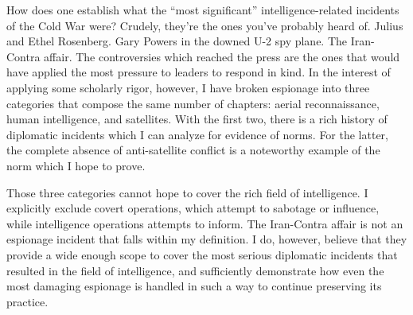 \documentclass{memoir}
\begin{document}
\begin{refsegment}
How does one establish what the ``most significant'' intelligence-related incidents of the Cold War were? Crudely, they're the ones you've probably heard of. Julius and Ethel Rosenberg. Gary Powers in the downed U-2 spy plane. The Iran-Contra affair. The controversies which reached the press are the ones that would have applied the most pressure to leaders to respond in kind. In the interest of applying some scholarly rigor, however, I have broken espionage into three categories that compose the same number of chapters: aerial reconnaissance, human intelligence, and satellites. With the first two, there is a rich history of diplomatic incidents which I can analyze for evidence of norms. For the latter, the complete absence of anti-satellite conflict is a noteworthy example of the norm which I hope to prove.

Those three categories cannot hope to cover the rich field of intelligence. I explicitly exclude covert operations, which attempt to sabotage or influence, while intelligence operations attempts to inform. The Iran-Contra affair is not an espionage incident that falls within my definition. I do, however, believe that they provide a wide enough scope to cover the most serious diplomatic incidents that resulted in the field of intelligence, and sufficiently demonstrate how even the most damaging espionage is handled in such a way to continue preserving its practice.





\end{refsegment}
\end{document}

